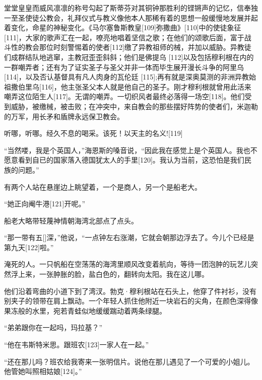 \documentclass{article}
\begin{document}
堂堂皇皇而威风凛凛的称号勾起了斯蒂芬对其铜钟那胜利的铿锵声的记忆，信奉独一至圣使徒公教会，礼拜仪式与教义像他本人那稀有着的思想一般缓慢地发展并起着变化，命星的神秘变化。《马尔塞鲁斯教皇[109]弥撒曲》[110]中的使徒象征[111]，大家的歌声汇在一起，嘹亮地唱着坚信之歌；在他们的颂歌后面，富于战斗性的教会那位时刻警惕着的使者[112]缴了异教祖师的械，并加以威胁。异教徒们成群结队地逃窜，主教冠歪歪斜斜；他们是佛提乌 [112]以及包括穆利根在内的一群嘲弄者；还有为了证实圣子与圣父并非一体而毕生展开漫长斗争的阿里乌[114]，以及否认基督具有凡人肉身的瓦伦廷 [115];再有就是深奥莫测的非洲异教始祖撒伯里乌[116]，他主张圣父本人就是他自己的圣子。刚才穆利根就曾用此活来嘲弄这位陌生人[117]。无谓的嘲弄。一切织风者最终必落得一场空[118]。他们受到威胁，被缴械，被击败；在冲突中，来自教会的那些摆好阵势的使者们，米迦勒的万军，用长矛和盾牌永远保卫教会。



听哪，听哪。经久不息的喝采。该死！以天主的名义![119]



“当然喽，我是个英国人，”海恩斯的嗓音说，“因此我在感觉上是个英国人。我也不愿意看到自已的国家落入德国犹太人的手里[120]。我认为当前，这恐怕是我们民族的问题。”



有两个人站在悬崖边上眺望着，一个是商人，另一个是船老大。



“她正向阉牛港[121]开呢。”



船老大略带轻蔑神情朝海湾北部点了点头。



“那一带有五[]深，”他说，“一点钟左右涨潮，它就会朝那边浮去了。今儿个已经是第九天[122]啦。”



淹死的人。一只帆船在空荡荡的海湾里顺风改变着航向，等待一团泡肿的玩艺儿突然浮上来，一张肿胀的脸，盐白色的，翻转向太阳。我在这儿哪。



他们沿着弯曲的小道下到了湾汊。勃克·穆利根站在石头上，他穿了件衬衫，没有别夹子的领带在肩上飘动。一个年轻人抓住他附近一块岩石的尖角，在颜色深得像果冻般的水里，宛若青蛙似地缓缓踹动着两条绿腿。



“弟弟跟你在一起吗，玛拉基？”



“他在韦斯特米思。跟班农[123]一家人在一起。”



“还在那儿吗？班农给我寄来一张明信片。说他在那儿遇见了一个可爱的小姐儿。他管她叫照相姑娘[124]。”
\end{document}
